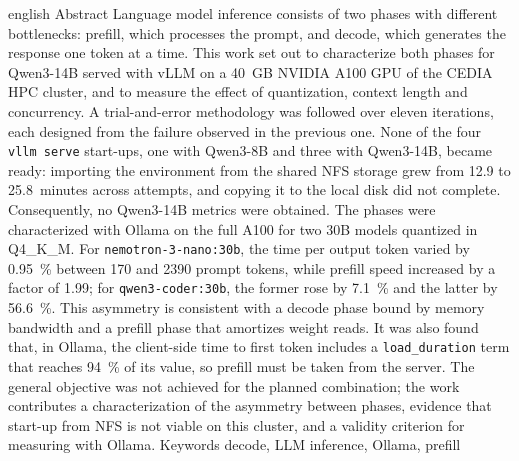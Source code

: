 \UTIResumenPagina
  {english}
  {Abstract}
  {Language model inference consists of two phases with different bottlenecks: prefill, which processes the prompt, and decode, which generates the response one token at a time. This work set out to characterize both phases for Qwen3-14B served with vLLM on a 40~GB NVIDIA A100 GPU of the CEDIA HPC cluster, and to measure the effect of quantization, context length and concurrency. A trial-and-error methodology was followed over eleven iterations, each designed from the failure observed in the previous one. None of the four \texttt{vllm serve} start-ups, one with Qwen3-8B and three with Qwen3-14B, became ready: importing the environment from the shared NFS storage grew from 12.9 to 25.8~minutes across attempts, and copying it to the local disk did not complete. Consequently, no Qwen3-14B metrics were obtained. The phases were characterized with Ollama on the full A100 for two 30B models quantized in Q4\_K\_M. For \texttt{nemotron-3-nano:30b}, the time per output token varied by 0.95~\% between 170 and 2390 prompt tokens, while prefill speed increased by a factor of 1.99; for \texttt{qwen3-coder:30b}, the former rose by 7.1~\% and the latter by 56.6~\%. This asymmetry is consistent with a decode phase bound by memory bandwidth and a prefill phase that amortizes weight reads. It was also found that, in Ollama, the client-side time to first token includes a \texttt{load\_duration} term that reaches 94~\% of its value, so prefill must be taken from the server. The general objective was not achieved for the planned combination; the work contributes a characterization of the asymmetry between phases, evidence that start-up from NFS is not viable on this cluster, and a validity criterion for measuring with Ollama.}
  {Keywords}
  {decode, LLM inference, Ollama, prefill}

